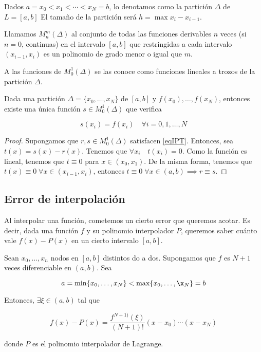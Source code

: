 \documentclass[nochap]{apuntes}
\begin{document}
Dados $a = x_0 < x_1 < \dotsb < x_N = b$, lo denotamos como la partición $\Delta$ de $L = [a,b]$  El tamaño de la partición será $h = \max x_i - x_{i-1}$.

\begin{defn}
Llamamos $M_n^m(\Delta)$ al conjunto de todas las funciones derivables $n$ veces (si $n= 0$, continuas) en el intervalo $[a,b]$ que restringidas a cada intervalo $(x_{i-1}, x_i)$ es un polinomio de grado menor o igual que $m$.
\end{defn}

A las funciones de $M_0^1(\Delta)$ se las conoce como funciones lineales a trozos de la partición $\Delta$.

\begin{theorem}
Dada una partición $\Delta = \{x_0,\dotsc,x_N\}$ de $[a,b]$ y $f(x_0),\dotsc, f(x_N)$, entonces existe una única función $s\in M_0^1(\Delta)$ que verifica

\begin{equation}
s(x_i)  = f(x_i)\quad \forall i =0,1,\dotsc ,  N \label{eqIPT}
\end{equation}
\end{theorem}

\begin{proof}
Supongamos que $r,s \in M_0^1(\Delta)$ satisfacen \ref{eqIPT}. Entonces, sea $t(x)  = s(x) - r(x)$. Tenemos que $\forall x_i \quad t(x_i) = 0$. Como la función es lineal, tenemos que $t\equiv 0$ para $x \in (x_0, x_1)$. De la misma forma, tenemos que $t(x)\equiv 0\;\forall x\in(x_{i-1}, x_i)$, entonces $t\equiv 0 \; \forall x\in (a,b) \implies r\equiv s$.
\end{proof}

\subsection{Error de interpolación}

Al interpolar una función, cometemos un cierto error que queremos acotar. Es decir, dada una función $f$ y su polinomio interpolador $P$, queremos saber cuánto vale $f(x) - P(x)$ en un cierto intervalo $[a, b]$.


\begin{theorem}
Sean $x_0,\dotsc, x_n$ nodos en $[a,b]$ distintos do a dos. Supongamos que $f$ es $N+1$ veces diferenciable en $(a,b)$. Sea

\[ a = \min\{x_0,\dotsc,x_N\} < \max \{x_0,\dotsc,\x_N\} = b \]

Entonces, $\exists \xi \in (a,b)$ tal que 

\[ f(x) - P(x) = \frac{f^{N+1)}(\xi)}{(N+1)!}(x-x_0)\dotsb (x-x_N) \]

donde $P$ es el polinomio interpolador de Lagrange.
\end{theorem}
\end{document}
